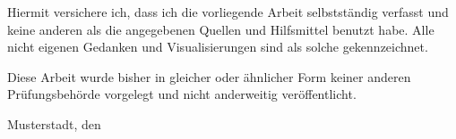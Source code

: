 Hiermit versichere ich, dass ich die vorliegende Arbeit selbstständig verfasst
und keine anderen als die angegebenen Quellen und Hilfsmittel benutzt habe.
Alle nicht eigenen Gedanken und Visualisierungen sind als solche gekennzeichnet.

Diese Arbeit wurde bisher in gleicher oder ähnlicher Form keiner anderen Prüfungsbehörde vorgelegt und nicht anderweitig veröffentlicht.

\vspace{1cm}

Musterstadt, den \abgabedat
